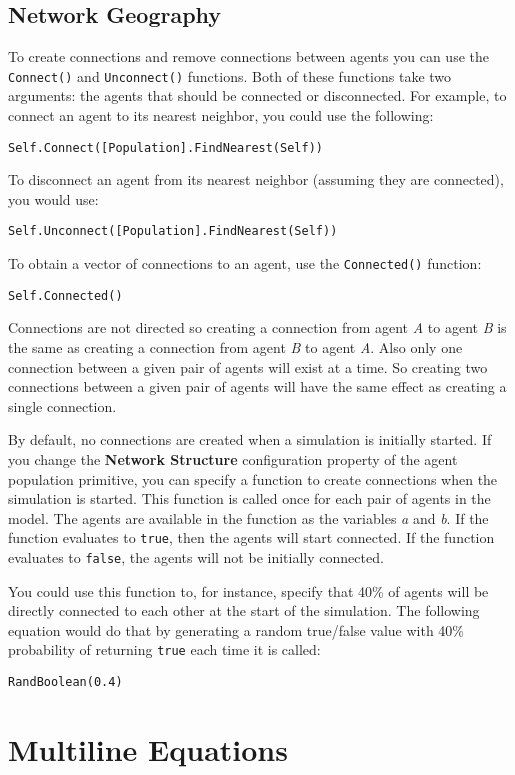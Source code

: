 \documentclass[]{memoir}
\renewcommand{\a}[1]{\textbf{#1}}
\begin{document}
\subsection{Network Geography}

To create connections and remove connections between agents you can use
the \lstinline!Connect()! and \lstinline!Unconnect()! functions. Both of
these functions take two arguments: the agents that should be connected
or disconnected. For example, to connect an agent to its nearest
neighbor, you could use the following:

\lstinline!Self.Connect([Population].FindNearest(Self))!

To disconnect an agent from its nearest neighbor (assuming they are
connected), you would use:

\lstinline!Self.Unconnect([Population].FindNearest(Self))!

To obtain a vector of connections to an agent, use the
\lstinline!Connected()! function:

\lstinline!Self.Connected()!

Connections are not directed so creating a connection from agent
\emph{A} to agent \emph{B} is the same as creating a connection from
agent \emph{B} to agent \emph{A}. Also only one connection between a
given pair of agents will exist at a time. So creating two connections
between a given pair of agents will have the same effect as creating a
single connection.

By default, no connections are created when a simulation is initially
started. If you change the \a{Network Structure} configuration property
of the agent population primitive, you can specify a function to create
connections when the simulation is started. This function is called once
for each pair of agents in the model. The agents are available in the
function as the variables \emph{a} and \emph{b}. If the function
evaluates to \lstinline!true!, then the agents will start connected. If
the function evaluates to \lstinline!false!, the agents will not be
initially connected.

You could use this function to, for instance, specify that 40\% of
agents will be directly connected to each other at the start of the
simulation. The following equation would do that by generating a random
true/false value with 40\% probability of returning \lstinline!true!
each time it is called:

\lstinline!RandBoolean(0.4)!

\section{Multiline Equations}
\end{document}
